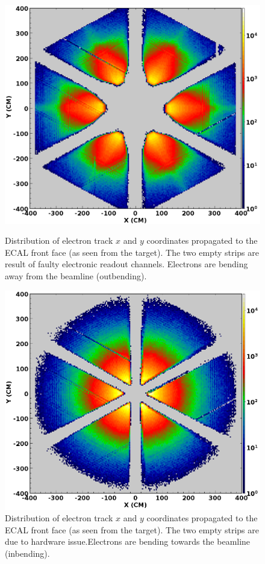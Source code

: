 \documentclass[final,3p,twocolumn]{elsarticle}
\begin{document}
\begin{figure}[t!]
\centerline{\includegraphics[width=1.0\columnwidth]{e-outbending.png}}
\caption{Distribution of electron track $x$ and $y$ coordinates propagated to the ECAL front face (as seen from the target). 
The two empty strips are result of faulty electronic readout channels. Electrons are bending away from the beamline (outbending). } 
\label{electrons-xy-in}
\vspace{0.3cm}
\centerline{\includegraphics[width=1.0\columnwidth]{e-inbending.png}}
\caption{Distribution of electron track $x$ and $y$ coordinates propagated to the ECAL front face (as seen from the target). 
The two empty strips are due to hardware issue.Electrons are bending towards the beamline (inbending).  }
\label{electrons-xy-out}
\end{figure}
\end{document}
